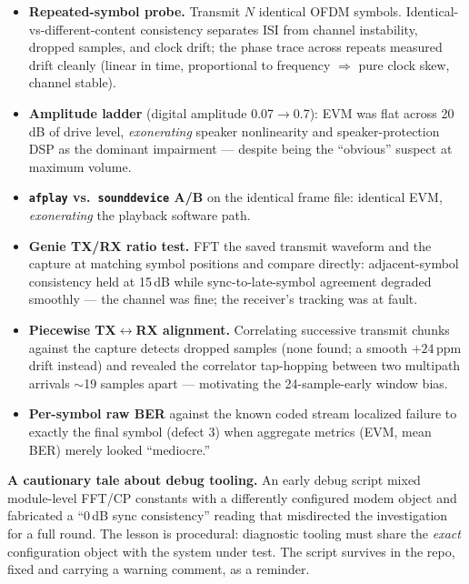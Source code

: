 \documentclass[11pt]{article}
\begin{document}
\begin{itemize}
  \item \textbf{Repeated-symbol probe.} Transmit $N$ identical OFDM symbols.
        Identical-vs-different-content consistency separates ISI from channel
        instability, dropped samples, and clock drift; the phase trace across
        repeats measured drift cleanly (linear in time, proportional to
        frequency $\Rightarrow$ pure clock skew, channel stable).
  \item \textbf{Amplitude ladder} (digital amplitude 0.07$\to$0.7): EVM was
        flat across 20\,dB of drive level, \emph{exonerating} speaker
        nonlinearity and speaker-protection DSP as the dominant impairment ---
        despite being the ``obvious'' suspect at maximum volume.
  \item \textbf{\texttt{afplay} vs.\ \texttt{sounddevice} A/B} on the
        identical frame file: identical EVM, \emph{exonerating} the playback
        software path.
  \item \textbf{Genie TX/RX ratio test.} FFT the saved transmit waveform and
        the capture at matching symbol positions and compare directly:
        adjacent-symbol consistency held at 15\,dB while sync-to-late-symbol
        agreement degraded smoothly --- the channel was fine; the receiver's
        tracking was at fault.
  \item \textbf{Piecewise TX$\leftrightarrow$RX alignment.} Correlating
        successive transmit chunks against the capture detects dropped
        samples (none found; a smooth $+24$\,ppm drift instead) and revealed
        the correlator tap-hopping between two multipath arrivals $\sim$19
        samples apart --- motivating the 24-sample-early window bias.
  \item \textbf{Per-symbol raw BER} against the known coded stream localized
        failure to exactly the final symbol (defect 3) when aggregate metrics
        (EVM, mean BER) merely looked ``mediocre.''
\end{itemize}

\textbf{A cautionary tale about debug tooling.} An early debug script mixed
module-level FFT/CP constants with a differently configured modem object and
fabricated a ``0\,dB sync consistency'' reading that misdirected the
investigation for a full round. The lesson is procedural: diagnostic tooling
must share the \emph{exact} configuration object with the system under test.
The script survives in the repo, fixed and carrying a warning comment, as a
reminder.
\end{document}
